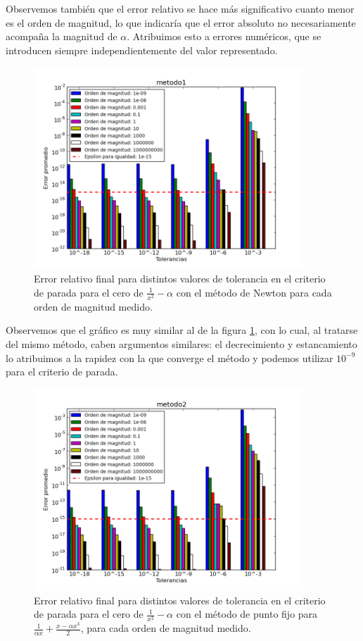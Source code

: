 Observemos también que el error relativo se hace más significativo cuanto menor es el orden de magnitud, lo que indicaría que el error absoluto no necesariamente acompaña la magnitud de $\alpha$. Atribuimos esto a errores numéricos, que se introducen siempre independientemente del valor representado.


\begin{figure}[H]
  \centering
    \includegraphics[width=0.9\textwidth]{../data/metodo1.png}
    \caption{Error relativo final para distintos valores de tolerancia en el criterio de parada para el cero de $\frac{1}{x^2} - \alpha$ con el método de Newton para cada orden de magnitud medido.}
    \label{paradaMet1}
\end{figure}

Observemos que el gráfico es muy similar al de la figura \ref{paradaMet1}, con lo cual, al tratarse del mismo método, caben argumentos similares: el decrecimiento y estancamiento lo atribuimos a la rapidez con la que converge el método y podemos utilizar $10^{-9}$ para el criterio de parada.

\begin{figure}[H]
  \centering
    \includegraphics[width=0.9\textwidth]{../data/metodo2.png}
    \caption{Error relativo final para distintos valores de tolerancia en el criterio de parada para el cero de $\frac{1}{x^2} - \alpha$ con el método de punto fijo para $\frac{1}{\alpha x} + \frac{x - \alpha x^3}{2}$, para cada orden de magnitud medido.}
    \label{paradaMet2}
\end{figure}

